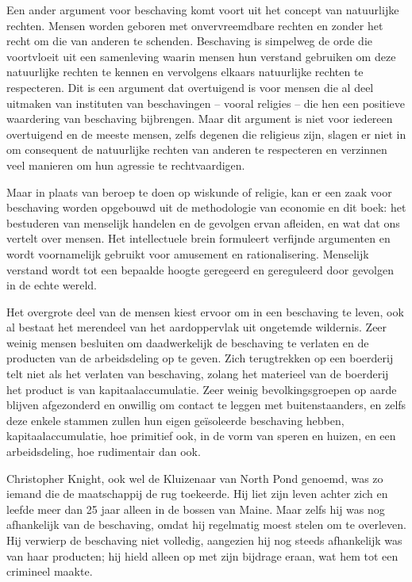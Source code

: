 Een ander argument voor beschaving komt voort uit het concept van natuurlijke rechten. Mensen worden geboren met onvervreemdbare rechten en zonder het recht om die van anderen te schenden. Beschaving is simpelweg de orde die voortvloeit uit een samenleving waarin mensen hun verstand gebruiken om deze natuurlijke rechten te kennen en vervolgens elkaars natuurlijke rechten te respecteren. Dit is een argument dat overtuigend is voor mensen die al deel uitmaken van instituten van beschavingen -- vooral religies -- die hen een positieve waardering van beschaving bijbrengen. Maar dit argument is niet voor iedereen overtuigend en de meeste mensen, zelfs degenen die religieus zijn, slagen er niet in om consequent de natuurlijke rechten van anderen te respecteren en verzinnen veel manieren om hun agressie te rechtvaardigen.

Maar in plaats van beroep te doen op wiskunde of religie, kan er een zaak voor beschaving worden opgebouwd uit de methodologie van economie en dit boek: het bestuderen van menselijk handelen en de gevolgen ervan afleiden, en wat dat ons vertelt over mensen. Het intellectuele brein formuleert verfijnde argumenten en wordt voornamelijk gebruikt voor amusement en rationalisering. Menselijk verstand wordt tot een bepaalde hoogte geregeerd en gereguleerd door gevolgen in de echte wereld.

Het overgrote deel van de mensen kiest ervoor om in een beschaving te leven, ook al bestaat het merendeel van het aardoppervlak uit ongetemde wildernis. Zeer weinig mensen besluiten om daadwerkelijk de beschaving te verlaten en de producten van de arbeidsdeling op te geven. Zich terugtrekken op een boerderij telt niet als het verlaten van beschaving, zolang het materieel van de boerderij het product is van kapitaalaccumulatie. Zeer weinig bevolkingsgroepen op aarde blijven afgezonderd en onwillig om contact te leggen met buitenstaanders, en zelfs deze enkele stammen zullen hun eigen geïsoleerde beschaving hebben, kapitaalaccumulatie, hoe primitief ook, in de vorm van speren en huizen, en een arbeidsdeling, hoe rudimentair dan ook.

Christopher Knight, ook wel de Kluizenaar van North Pond genoemd, was zo iemand die de maatschappij de rug toekeerde. Hij liet zijn leven achter zich en leefde meer dan 25 jaar alleen in de bossen van Maine. Maar zelfs hij was nog afhankelijk van de beschaving, omdat hij regelmatig moest stelen om te overleven. Hij verwierp de beschaving niet volledig, aangezien hij nog steeds afhankelijk was van haar producten; hij hield alleen op met zijn bijdrage eraan, wat hem tot een crimineel maakte.\autocite{218}

